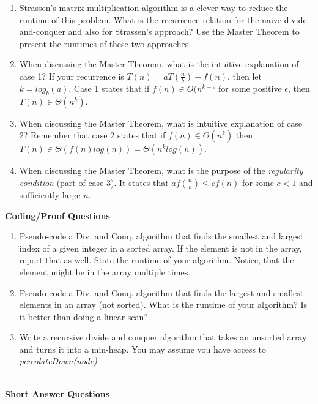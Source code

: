\documentclass[10pt]{article}
\newcounter{pagenum}
\newcommand{\pageheader}[1]{
\clearpage\vspace*{-0.4in}\noindent{\large\bf{{#1}}}
\addtocounter{pagenum}{1}
\cfoot{}
}
\begin{document}
\begin{enumerate}
	\setlength\itemsep{0.25em}
	\item Strassen's matrix multiplication algorithm is a clever way to reduce the runtime of this problem. What is the recurrence relation for the naive divide-and-conquer and also for Strassen's approach? Use the Master Theorem to present the runtimes of these two approaches.
	\item When discussing the Master Theorem, what is the intuitive explanation of case 1? If your recurrence is $T(n)=aT(\frac{n}{b})+f(n)$, then let $k=log_b(a)$. Case 1 states that if $f(n) \in O(n^{k-\epsilon}$ for some positive $\epsilon$, then $T(n) \in \Theta(n^k)$.
	\item When discussing the Master Theorem, what is intuitive explanation of case 2? Remember that case 2 states that if $f(n) \in \Theta(n^k)$ then $T(n) \in \Theta(f(n)log(n)) = \Theta(n^klog(n))$.
	\item When discussing the Master Theorem, what is the purpose of the \emph{regularity condition} (part of case 3). It states that $af(\frac{n}{b}) \leq cf(n)$ for some $c<1$ and sufficiently large $n$.
\end{enumerate}

\vspace{0.5in}

\textbf{Coding/Proof Questions}
\begin{enumerate}
	\setlength\itemsep{0.25em}
	\item Pseudo-code a Div. and Conq. algorithm that finds the smallest and largest index of a given integer in a sorted array. If the element is not in the array, report that as well. State the runtime of your algorithm. Notice, that the element might be in the array multiple times.
	\item Pseudo-code a Div. and Conq. algorithm that finds the largest and smallest elements in an array (not sorted). What is the runtime of your algorithm? Is it better than doing a linear scan?
	\item Write a recursive divide and conquer algorithm that takes an unsorted array and turns it into a min-heap. You may assume you have access to \emph{percolateDown(node)}.
\end{enumerate}


\pageheader{Dynamic Programming: Basic}

\noindent \\
\textbf{Short Answer Questions}
\end{document}
